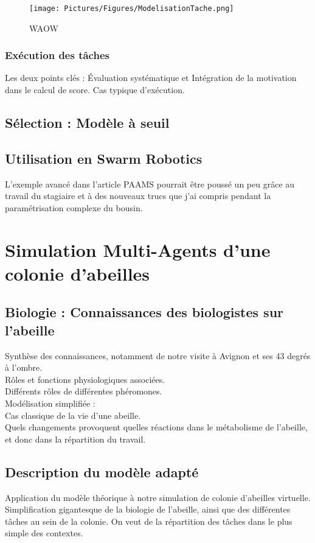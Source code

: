 \documentclass[10pt,a4paper]{article}
\begin{document}
			\begin{figure}
			\centering
			\texttt{[image: Pictures/Figures/ModelisationTache.png]}
			\caption{WAOW}
			\label{ModelisationTache}
			\end{figure}
		\subsubsection{Exécution des tâches}
			Les deux points clés : Évaluation systématique et Intégration de la motivation dans le calcul de score.
			Cas typique d'exécution.
	\subsection{Sélection : Modèle à seuil}
	\subsection{Utilisation en Swarm Robotics}
		L'exemple avancé dans l'article PAAMS pourrait être poussé un peu grâce au travail du stagiaire et à des nouveaux trucs que j'ai compris pendant la paramétrisation complexe du bousin.
			
\section{Simulation Multi-Agents d'une colonie d'abeilles}
	\subsection{Biologie : Connaissances des biologistes sur l'abeille}
		Synthèse des connaissances, notamment de notre visite à Avignon et ses 43 degrés à l'ombre.\\
		
		Rôles et fonctions physiologiques associées.\\
		Différents rôles de différentes phéromones.\\
		Modélisation simplifiée : \\
		Cas classique de la vie d'une abeille.\\
		Quels changements provoquent quelles réactions dans le métabolisme de l'abeille, et donc dans la répartition du travail.
	\subsection{Description du modèle adapté}
		Application du modèle théorique à notre simulation de colonie d'abeilles virtuelle.
		Simplification gigantesque de la biologie de l'abeille, ainsi que des différentes tâches au sein de la colonie.
		On veut de la répartition des tâches dans le plus simple des contextes.
\end{document}
